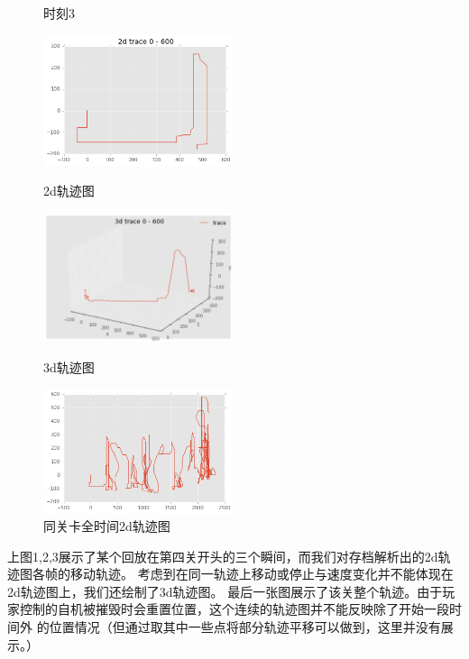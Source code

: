 \documentclass[UTF8]{ctexart}
\begin{document}
\begin{figure}[H]
\begin{minipage}[t]{0.5\linewidth}
\caption{时刻3}
\end{minipage}
\begin{minipage}[t]{0.5\linewidth}
\centering
\includegraphics[width=2.2in]{images/trace2d.png}
\caption{2d轨迹图}
\end{minipage}
\begin{minipage}[t]{0.5\linewidth}
\centering
\includegraphics[width=2.2in]{images/trace3d.png}
\caption{3d轨迹图}
\end{minipage}
\begin{minipage}[t]{0.5\linewidth}
\centering
\includegraphics[width=2.2in]{images/trace2dfull.png}
\caption{同关卡全时间2d轨迹图}
\end{minipage}
\end{figure}

上图1,2,3展示了某个回放在第四关开头的三个瞬间，而我们对存档解析出的2d轨迹图各帧的移动轨迹。
考虑到在同一轨迹上移动或停止与速度变化并不能体现在2d轨迹图上，我们还绘制了3d轨迹图。
最后一张图展示了该关整个轨迹。由于玩家控制的自机被摧毁时会重置位置，这个连续的轨迹图并不能反映除了开始一段时间外
的位置情况（但通过取其中一些点将部分轨迹平移可以做到，这里并没有展示。）
\end{document}
